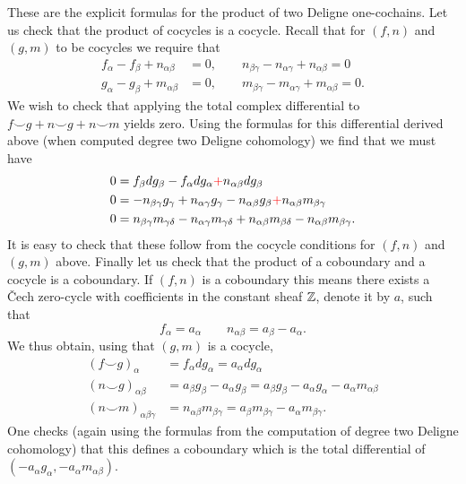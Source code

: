 \documentclass{amsart}
\begin{document}
These are the explicit formulas for the product of two Deligne one-cochains.
Let us check that the product of cocycles is a cocycle. Recall that for
$(f,n)$ and $(g,m)$ to be cocycles we require that
\begin{align*}
    f_\alpha-f_\beta + n_{\alpha\beta} &= 0, \qquad n_{\beta\gamma}-n_{\alpha\gamma}+n_{\alpha\beta}=0 \\
    g_\alpha-g_\beta + m_{\alpha\beta} &= 0, \qquad m_{\beta\gamma}-m_{\alpha\gamma}+m_{\alpha\beta}=0.
\end{align*}
We wish to check that applying the total complex differential to
$f\smile g + n\smile g + n\smile m$ yields zero. Using the formulas
for this differential derived above (when computed degree two Deligne cohomology)
we find that we must have
\begin{align*}
    0 &= f_\beta dg_\beta - f_\alpha dg_\alpha  {\color{red} + } n_{\alpha\beta}dg_\beta \\
    0 &= -n_{\beta\gamma}g_\gamma + n_{\alpha\gamma}g_\gamma - n_{\alpha\beta}g_\beta {\color{red} + } n_{\alpha\beta}m_{\beta\gamma} \\
    0 &= n_{\beta\gamma}m_{\gamma\delta} - n_{\alpha\gamma}m_{\gamma\delta} + n_{\alpha\beta}m_{\beta\delta} - n_{\alpha\beta}m_{\beta\gamma}.
\end{align*}
It is easy to check that these follow from the cocycle conditions for $(f,n)$ and
$(g,m)$ above. 
Finally let us check that the product of a coboundary and a cocycle is a coboundary.
If $(f,n)$ is a coboundary this means there exists a \v Cech zero-cycle with coefficients
in the constant sheaf $\mathbb{Z}$, denote it by $a$, such that
\begin{equation*}
    f_\alpha = a_\alpha \qquad n_{\alpha\beta} = a_\beta-a_\alpha.
\end{equation*}
We thus obtain, using that $(g,m)$ is a cocycle,
\begin{align*}
    (f\smile g)_\alpha &= f_\alpha dg_\alpha = a_\alpha dg_\alpha \\
    (n\smile g)_{\alpha\beta} &= a_\beta g_\beta-a_\alpha g_\beta = a_\beta g_\beta - a_\alpha g_\alpha - a_\alpha m_{\alpha\beta} \\
    (n\smile m)_{\alpha\beta\gamma} &= n_{\alpha\beta}m_{\beta\gamma} = a_\beta m_{\beta\gamma} - a_\alpha m_{\beta\gamma}.
\end{align*}
One checks (again using the formulas from the computation of degree two Deligne cohomology)
that this defines a coboundary which is the total differential of $(-a_\alpha g_\alpha, -a_\alpha m_{\alpha\beta})$.
\end{document}
